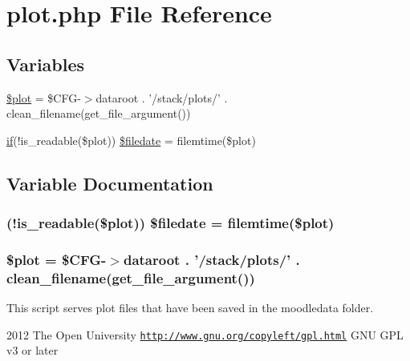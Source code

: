 \hypertarget{plot_8php}{
\section{plot.php File Reference}
\label{plot_8php}
}
\subsection*{Variables}
\begin{DoxyCompactItemize}
\item 
\hyperlink{plot_8php_a5b0a06d0a335775afd5e4b1875fa1f74}{\$plot} = \$CFG-\/$>$dataroot . '/stack/plots/' . clean\_\-filename(get\_\-file\_\-argument())
\item 
\hyperlink{caschat_8php_a2018ad56dfaea89ba7f32f4f912be98f}{if}(!is\_\-readable(\$plot)) \hyperlink{plot_8php_a6365bffd0c5145920467c0d0bc04896c}{\$filedate} = filemtime(\$plot)
\end{DoxyCompactItemize}


\subsection{Variable Documentation}
\hypertarget{plot_8php_a6365bffd0c5145920467c0d0bc04896c}{
\subsubsection[{\$filedate}]{ (!is\_\-readable(\$plot)) \$filedate = filemtime(\$plot)}}
\label{plot_8php_a6365bffd0c5145920467c0d0bc04896c}
\hypertarget{plot_8php_a5b0a06d0a335775afd5e4b1875fa1f74}{
\subsubsection[{\$plot}]{\setlength{\rightskip}{0pt plus 5cm}\$plot = \$CFG-\/$>$dataroot . '/stack/plots/' . clean\_\-filename(get\_\-file\_\-argument())}}
\label{plot_8php_a5b0a06d0a335775afd5e4b1875fa1f74}
This script serves plot files that have been saved in the moodledata folder.

2012 The Open University  \href{http://www.gnu.org/copyleft/gpl.html}{\tt http://www.gnu.org/copyleft/gpl.html} GNU GPL v3 or later 